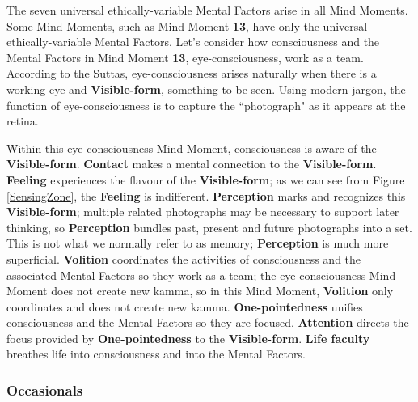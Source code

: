 The seven universal ethically-variable Mental Factors arise in all Mind Moments. Some Mind Moments, such as Mind Moment \textbf{13}, have only the universal ethically-variable Mental Factors. Let’s consider how consciousness and the Mental Factors in Mind Moment \textbf{13}, eye-consciousness, work as a team. According to the Suttas, eye-consciousness arises naturally when there is a working eye and \textbf{Visible-form}, something to be seen. Using modern jargon, the function of eye-consciousness is to capture the ``photograph" as it appears at the retina.

Within this eye-consciousness Mind Moment, consciousness is aware of the \textbf{Visible-form}. \textbf{Contact} makes a mental connection to the \textbf{Visible-form}. \textbf{Feeling} experiences the flavour of the \textbf{Visible-form}; as we can see from Figure \ref{SensingZone}, the \textbf{Feeling} is indifferent. \textbf{Perception} marks and recognizes this \textbf{Visible-form}; multiple related photographs may be necessary to support later thinking, so \textbf{Perception} bundles past, present and future photographs into a set. This is not what we normally refer to as memory; \textbf{Perception} is much more superficial. \textbf{Volition} coordinates the activities of consciousness and the associated Mental Factors so they work as a team; the eye-consciousness Mind Moment does not create new kamma, so in this Mind Moment, \textbf{Volition} only coordinates and does not create new kamma. \textbf{One-pointedness} unifies consciousness and the Mental Factors so they are focused. \textbf{Attention} directs the focus provided by \textbf{One-pointedness} to the \textbf{Visible-form}. \textbf{Life faculty} breathes life into consciousness and into the Mental Factors. 


\subsubsection*{Occasionals}

